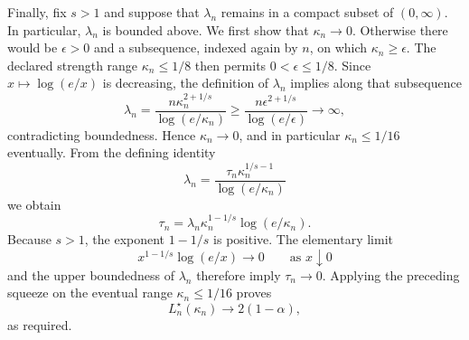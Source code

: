 Finally, fix \(s>1\) and suppose that \(\lambda_n\) remains in a
compact subset of \((0,\infty)\).  In particular, \(\lambda_n\) is
bounded above.  We first show that \(\kappa_n\to0\).  Otherwise there
would be \(\epsilon>0\) and a subsequence, indexed again by \(n\), on
which \(\kappa_n\ge\epsilon\).  The declared strength range
\(\kappa_n\le1/8\) then permits \(0<\epsilon\le1/8\).  Since
\(x\mapsto\log(e/x)\) is decreasing, the definition of \(\lambda_n\)
implies along that subsequence
\[
 \lambda_n
 =\frac{n\kappa_n^{2+1/s}}{\log(e/\kappa_n)}
 \ge
 \frac{n\epsilon^{2+1/s}}{\log(e/\epsilon)}
 \longrightarrow\infty,
\]
contradicting boundedness.  Hence \(\kappa_n\to0\), and in particular
\(\kappa_n\le1/16\) eventually.  From the defining identity
\[
 \lambda_n
 =\frac{\tau_n\kappa_n^{1/s-1}}{\log(e/\kappa_n)}
\]
we obtain
\[
 \tau_n
 =\lambda_n\kappa_n^{1-1/s}\log(e/\kappa_n).
\]
Because \(s>1\), the exponent \(1-1/s\) is positive.  The elementary
limit
\[
 x^{1-1/s}\log(e/x)\longrightarrow0
 \qquad\text{as }x\downarrow0
\]
and the upper boundedness of \(\lambda_n\) therefore imply
\(\tau_n\to0\).  Applying the preceding squeeze on the eventual range
\(\kappa_n\le1/16\) proves
\[
 L_n^\star(\kappa_n)\longrightarrow2(1-\alpha),
\]
as required.
